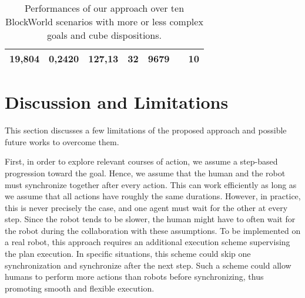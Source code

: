 \begin{sidewaystable}[]
\begin{tabular}{|c|c|c|c|c|ccccc|c|}
    19,804                                                                  & 0,2420                                                                 & 127,13                                                               & 32                                                              & 9679                                                            & \multicolumn{5}{c|}{}                                                                                                                                                                                                                                                                                                                                                                                                                                & 10                                                             \\ \hline
    \end{tabular}
    \caption{Performances of our approach over ten BlockWorld scenarios with more or less complex goals and cube dispositions.  }
    \label{tab:performances}
\end{sidewaystable}

\clearpage
    
\section{Discussion and Limitations}


This section discusses a few limitations of the proposed approach and possible future works to overcome them. 

First, in order to explore relevant courses of action, we assume a step-based progression toward the goal. Hence, we assume that the human and the robot must synchronize together after every action. This can work efficiently as long as we assume that all actions have roughly the same durations. However, in practice, this is never precisely the case, and one agent must wait for the other at every step. Since the robot tends to be slower, the human might have to often wait for the robot during the collaboration with these assumptions. To be implemented on a real robot, this approach requires an additional execution scheme supervising the plan execution. In specific situations, this scheme could skip one synchronization and synchronize after the next step. Such a scheme could allow humans to perform more actions than robots before synchronizing, thus promoting smooth and flexible execution.


